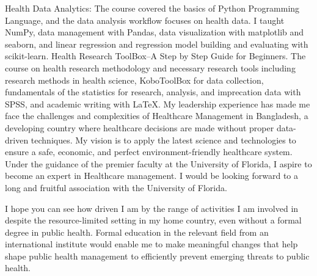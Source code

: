 \documentclass{article}
\begin{document}
Health Data Analytics: The course covered the basics of Python Programming Language, and the data analysis workflow focuses on health data. I taught NumPy, data management with Pandas, data visualization with matplotlib and seaborn, and linear regression and regression model building and evaluating with scikit-learn. Health Research ToolBox–A Step by Step Guide for Beginners. The course on health research methodology and necessary research tools including research methods in health science, KoboToolBox for data collection, fundamentals of the statistics for research, analysis, and imprecation data with SPSS, and academic writing with LaTeX. My leadership experience has made me face the challenges and complexities of Healthcare Management in Bangladesh, a developing country where healthcare decisions are made without proper data-driven techniques. My vision is to apply the latest science and technologies to ensure a safe, economic, and perfect environment-friendly healthcare system. Under the guidance of the premier faculty at the University of Florida, I aspire to become an expert in Healthcare management. I would be looking forward to a long and fruitful association with the University of Florida.

I hope you can see how driven I am by the range of activities I am involved in despite the resource-limited setting in my home country, even without a formal degree in public health. Formal education in the relevant field from an international institute would enable me to make meaningful changes that help shape public health management to efficiently prevent emerging threats to public health. 
\end{document}
